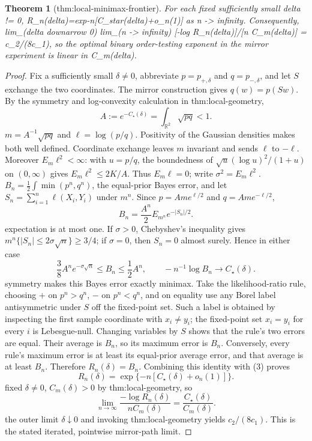 \documentclass{article}
\newtheorem{theorem}{Theorem}
\begin{document}
\begin{theorem}[thm:local-minimax-frontier]\label{thm:local-minimax-frontier}
For each fixed sufficiently small delta != 0, R_n(delta)=exp{-n[C_star(delta)+o_n(1)]} as n -> infinity. Consequently, lim_(delta downarrow 0) lim_(n -> infinity) [-log R_n(delta)]/[n C_m(delta)] = c_2/(8c_1), so the optimal binary order-testing exponent in the mirror experiment is linear in C_m(delta).
\end{theorem}
\begin{proof}
Fix a sufficiently small \(\delta\ne0\), abbreviate \(p=p_{+,\delta}\) and \(q=p_{-,\delta}\), and let \(S\) exchange the two coordinates. The mirror construction gives \(q(w)=p(Sw)\). By the symmetry and log-convexity calculation in thm:local-geometry,\n\[A:=e^{-C_\star(\delta)}=\int_{\mathbb R^2}\sqrt{pq}<1.\tag{1}\]\nDefine \(m=A^{-1}\sqrt{pq}\) and \(\ell=\log(p/q)\). Positivity of the Gaussian densities makes both well defined. Coordinate exchange leaves \(m\) invariant and sends \(\ell\) to \(-\ell\). Moreover \(E_m\ell^2<\infty\): with \(u=p/q\), the boundedness of \(\sqrt u(\log u)^2/(1+u)\) on \((0,\infty)\) gives \(E_m\ell^2\le2K/A\). Thus \(E_m\ell=0\); write \(\sigma^2=E_m\ell^2\).\n\nLet \(B_n=\frac12\int\min(p^n,q^n)\), the equal-prior Bayes error, and let \(S_n=\sum_{i=1}^n\ell(X_i,Y_i)\) under \(m^n\). Since \(p=Ame^{\ell/2}\) and \(q=Ame^{-\ell/2}\),\n\[B_n=\frac{A^n}{2}E_{m^n}e^{-|S_n|/2}.\tag{2}\]\nThe expectation is at most one. If \(\sigma>0\), Chebyshev's inequality gives \(m^n\{|S_n|\le2\sigma\sqrt n\}\ge3/4\); if \(\sigma=0\), then \(S_n=0\) almost surely. Hence in either case\n\[\frac38A^ne^{-\sigma\sqrt n}\le B_n\le\frac12A^n,\qquad -n^{-1}\log B_n\longrightarrow C_\star(\delta).\tag{3}\]\n\nMirror symmetry makes this Bayes error exactly minimax. Take the likelihood-ratio rule, choosing \(+\) on \(p^n>q^n\), \(-\) on \(p^n<q^n\), and on equality use any Borel label antisymmetric under \(S\) off the fixed-point set. Such a label is obtained by inspecting the first sample coordinate with \(x_i\ne y_i\); the fixed-point set \(x_i=y_i\) for every \(i\) is Lebesgue-null. Changing variables by \(S\) shows that the rule's two errors are equal. Their average is \(B_n\), so its maximum error is \(B_n\). Conversely, every rule's maximum error is at least its equal-prior average error, and that average is at least \(B_n\). Therefore \(R_n(\delta)=B_n\). Combining this identity with (3) proves\n\[R_n(\delta)=\exp\{-n[C_\star(\delta)+o_n(1)]\}.\tag{4}\]\nFor fixed \(\delta\ne0\), \(C_m(\delta)>0\) by thm:local-geometry, so\n\[\lim_{n\to\infty}\frac{-\log R_n(\delta)}{nC_m(\delta)}=\frac{C_\star(\delta)}{C_m(\delta)}.\]\nTaking the outer limit \(\delta\downarrow0\) and invoking thm:local-geometry yields \(c_2/(8c_1)\). This is the stated iterated, pointwise mirror-path limit.
\end{proof}
\end{document}
